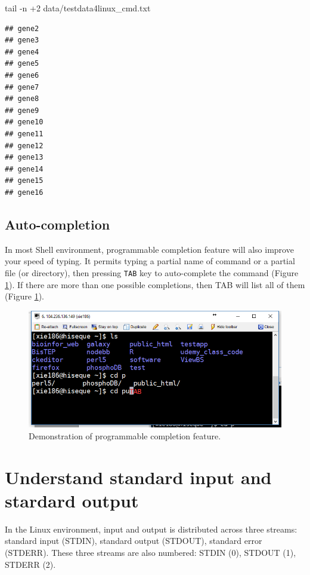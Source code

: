 \documentclass[]{book}
\makeatletter
\newenvironment{Shaded}{\begin{snugshade}}{\end{snugshade}}
\newcommand{\FunctionTok}[1]{\textcolor[rgb]{0.00,0.00,0.00}{#1}}
\newcommand{\NormalTok}[1]{#1}
\newenvironment{kframe}{%
\medskip{}
\setlength{\fboxsep}{.8em}
 \def\at@end@of@kframe{}%
 \ifinner\ifhmode%
  \def\at@end@of@kframe{\end{minipage}}%
  \begin{minipage}{\columnwidth}%
 \fi\fi%
 \def\FrameCommand##1{\hskip\@totalleftmargin \hskip-\fboxsep
 \colorbox{shadecolor}{##1}\hskip-\fboxsep
     \hskip-\linewidth \hskip-\@totalleftmargin \hskip\columnwidth}%
 \MakeFramed {\advance\hsize-\width
   \@totalleftmargin\z@ \linewidth\hsize
   \@setminipage}}%
 {\par\unskip\endMakeFramed%
 \at@end@of@kframe}
\renewenvironment{Shaded}{\begin{kframe}}{\end{kframe}}
\theoremstyle{definition}
\theoremstyle{definition}
\theoremstyle{definition}
\theoremstyle{remark}
\makeatother
\begin{document}
\begin{Shaded}
\begin{Highlighting}[]
\FunctionTok{tail}\NormalTok{ -n +2 data/testdata4linux_cmd.txt}
\end{Highlighting}
\end{Shaded}

\begin{verbatim}
## gene2
## gene3
## gene4
## gene5
## gene6
## gene7
## gene8
## gene9
## gene10
## gene11
## gene12
## gene13
## gene14
## gene15
## gene16
\end{verbatim}

\subsection{Auto-completion}\label{auto-completion}

In most Shell environment, programmable completion feature will also
improve your speed of typing. It permits typing a partial name of
command or a partial file (or directory), then pressing \texttt{TAB} key
to auto-complete the command (Figure \ref{fig:linuxAutoCompletion}). If
there are more than one possible completions, then TAB will list all of
them (Figure \ref{fig:linuxAutoCompletion}).




\begin{figure}
\centering
\includegraphics{figures/linuxAutoCompletion.png}
\caption{\label{fig:linuxAutoCompletion}Demonstration of programmable completion
feature.}
\end{figure}

\section{Understand standard input and stardard
output}\label{understand-standard-input-and-stardard-output}

In the Linux environment, input and output is distributed across three
streams: standard input (STDIN), standard output (STDOUT), standard
error (STDERR). These three streams are also numbered: STDIN (0), STDOUT
(1), STDERR (2).
\end{document}
